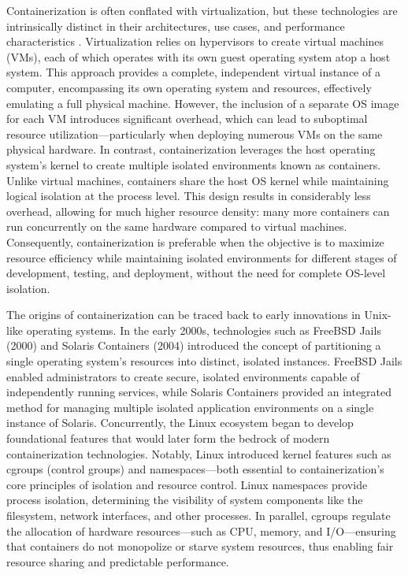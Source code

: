 Containerization is often conflated with virtualization, but these technologies are intrinsically distinct in their architectures, use cases, and performance characteristics \cite{dua_virtualization_2014}. Virtualization relies on hypervisors to create virtual machines (VMs), each of which operates with its own guest operating system atop a host system. This approach provides a complete, independent virtual instance of a computer, encompassing its own operating system and resources, effectively emulating a full physical machine. However, the inclusion of a separate OS image for each VM introduces significant overhead, which can lead to suboptimal resource utilization—particularly when deploying numerous VMs on the same physical hardware. In contrast, containerization leverages the host operating system's kernel to create multiple isolated environments known as containers. Unlike virtual machines, containers share the host OS kernel while maintaining logical isolation at the process level. This design results in considerably less overhead, allowing for much higher resource density: many more containers can run concurrently on the same hardware compared to virtual machines. Consequently, containerization is preferable when the objective is to maximize resource efficiency while maintaining isolated environments for different stages of development, testing, and deployment, without the need for complete OS-level isolation.

The origins of containerization can be traced back to early innovations in Unix-like operating systems. In the early 2000s, technologies such as FreeBSD Jails (2000) and Solaris Containers (2004) introduced the concept of partitioning a single operating system's resources into distinct, isolated instances. FreeBSD Jails enabled administrators to create secure, isolated environments capable of independently running services, while Solaris Containers provided an integrated method for managing multiple isolated application environments on a single instance of Solaris. Concurrently, the Linux ecosystem began to develop foundational features that would later form the bedrock of modern containerization technologies. Notably, Linux introduced kernel features such as cgroups (control groups) and namespaces—both essential to containerization's core principles of isolation and resource control. Linux namespaces provide process isolation, determining the visibility of system components like the filesystem, network interfaces, and other processes. In parallel, cgroups regulate the allocation of hardware resources—such as CPU, memory, and I/O—ensuring that containers do not monopolize or starve system resources, thus enabling fair resource sharing and predictable performance.

